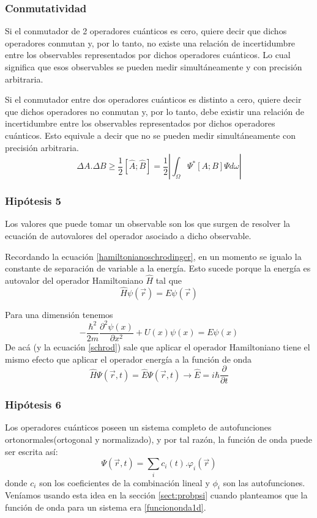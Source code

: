 \documentclass[10pt,twocolumn,titlepage]{article}
\newcommand{\dpartial}[2]{\frac{\partial^2 #1}{\partial #2^2}}
\newcommand{\psix}{\psi (x)}
\begin{document}
\subsubsection*{Conmutatividad}
Si el conmutador de 2 operadores cuánticos es cero, quiere decir que dichos operadores conmutan y, por lo tanto, no existe una relación de incertidumbre entre los observables representados por dichos operadores cuánticos. Lo cual significa que esos observables se pueden medir simultáneamente y con precisión arbitraria.

Si el conmutador entre dos operadores cuánticos es distinto a cero, quiere decir que dichos operadores no conmutan y, por lo tanto, debe existir una relación de incertidumbre entre los observables representados por dichos operadores cuánticos. Esto equivale a decir que no se pueden medir simultáneamente con precisión arbitraria.
$$\Delta A. \Delta B \geq \frac{1}{2} [\hat{A};\hat{B}]=\frac{1}{2} \left| \int_\Omega \Psi^*[A;B] \Psi d\omega \right|$$
\subsubsection*{Hipótesis 5}
Los valores que puede tomar un observable son los que surgen de resolver la ecuación de autovalores del operador asociado a dicho observable. 

Recordando la ecuación \eqref{hamiltonianoschrodinger}, en un momento se igualo la constante de separación de variable a la energía. Esto sucede porque la energía es autovalor del operador Hamiltoniano $\hat{H}$ tal que
$$\hat{H}\psi(\vec{r})=E\psi (\vec{r})$$

Para una dimensión tenemos
$$ -\frac{\hbar ^2}{2m}\dpartial{\psix}{x} +U(x)\psix=E\psix $$
De acá (y la ecuación \eqref{schrod}) sale que aplicar el operador Hamiltoniano tiene el mismo efecto que aplicar el operador energía a la función de onda
$$\hat{H}\Psi(\vec{r},t)=\hat{E}\Psi(\vec{r},t)\rightarrow \hat{E}=i\hbar \frac{\partial}{\partial t} $$
\subsubsection*{Hipótesis 6}
Los operadores cuánticos poseen un sistema completo de autofunciones ortonormales(ortogonal y normalizado), y por tal razón, la función de onda puede ser escrita así:
$$\Psi(\vec{r},t)=\sum_i c_i(t).\varphi_i(\vec{r}) $$
donde $c_i$ son los coeficientes de la combinación lineal y $\phi_i$ son las autofunciones. Veníamos usando esta idea en la sección \ref{sect:probpsi} cuando planteamos que la función de onda para un sistema era \eqref{funciononda1d}. 
\end{document}
